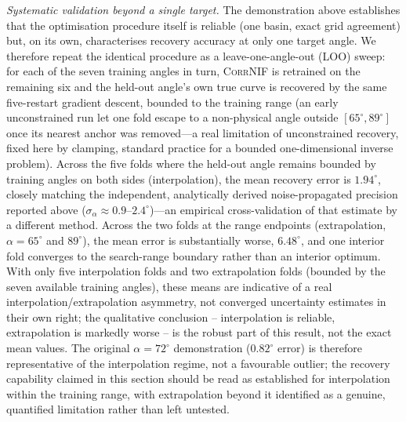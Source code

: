 \documentclass[aip,amsmath,amssymb,reprint]{revtex4-1}
\newcommand{\dang}{\ensuremath{\alpha}}
\begin{document}
\textit{Systematic validation beyond a single target.} The demonstration above
establishes that the optimisation procedure itself is reliable (one basin,
exact grid agreement) but, on its own, characterises recovery accuracy at only
one target angle. We therefore repeat the identical procedure as a
leave-one-angle-out (LOO) sweep: for each of the seven training angles in
turn, \textsc{CorrNIF} is retrained on the remaining six and the held-out
angle's own true curve is recovered by the same five-restart gradient descent,
bounded to the training range (an early unconstrained run let one fold escape
to a non-physical angle outside $[65^{\circ},89^{\circ}]$ once its nearest
anchor was removed---a real limitation of unconstrained recovery, fixed here
by clamping, standard practice for a bounded one-dimensional inverse problem).
Across the five folds where the held-out angle remains bounded by training
angles on both sides (interpolation), the mean recovery error is
$1.94^{\circ}$, closely matching the independent, analytically derived
noise-propagated precision reported above ($\sigma_{\dang}\approx0.9$--$2.4^{\circ}$)---an
empirical cross-validation of that estimate by a different method. Across the
two folds at the range endpoints (extrapolation, $\dang=65^{\circ}$ and
$89^{\circ}$), the mean error is substantially worse, $6.48^{\circ}$, and one
interior fold converges to the search-range boundary rather than an interior
optimum. With only five interpolation folds and two extrapolation folds
(bounded by the seven available training angles), these means are
indicative of a real interpolation/extrapolation asymmetry, not converged
uncertainty estimates in their own right; the qualitative conclusion --
interpolation is reliable, extrapolation is markedly worse -- is the
robust part of this result, not the exact mean values. The original
$\dang=72^{\circ}$ demonstration ($0.82^{\circ}$ error)
is therefore representative of the interpolation regime, not a favourable
outlier; the recovery capability claimed in this section should be read as
established for interpolation within the training range, with extrapolation
beyond it identified as a genuine, quantified limitation rather than left
untested.
\end{document}
